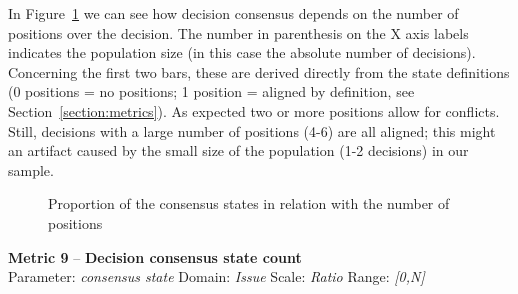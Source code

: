 \documentclass[article]{elsarticle}
\begin{document}
In Figure~\ref{fig:M8} we can see how decision consensus depends on the number of positions over the decision. The number in parenthesis on the X axis labels indicates the population size (in this case the absolute number of decisions).  Concerning the first two bars, these are derived directly from the state definitions (0 positions = no positions; 1 position = aligned by definition, see Section~\ref{section:metrics}). As expected two or more positions allow for conflicts. Still, decisions with a large number of positions (4-6) are all aligned; this might an artifact caused by the small size of the population (1-2 decisions) in our sample. 
\begin{figure}
  \begin{center}

  \caption{Proportion of the consensus states in relation with the number of positions}
  \label{fig:M8}
  \end{center}
\end{figure}

\clearpage
\noindent
\textbf{Metric 9} -- \textbf{Decision consensus state count}\\
Parameter: \emph{consensus state} Domain: \emph{Issue} Scale: \emph{Ratio} Range: \emph{[0,N]}
\end{document}
